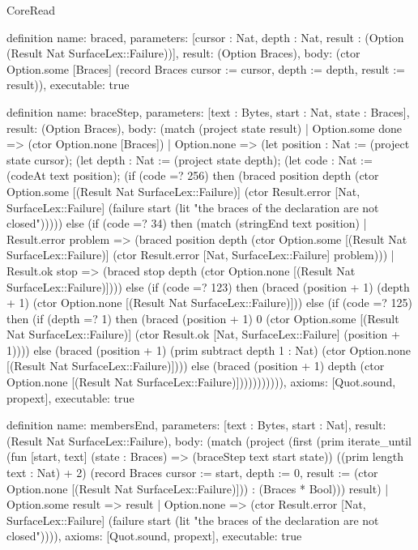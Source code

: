 \begin{lexlean}{CoreRead}
\begin{semanticmodule}
definition{
  name: braced,
  parameters: [cursor : Nat, depth : Nat, result : (Option (Result Nat SurfaceLex::Failure))],
  result: (Option Braces),
  body: (ctor Option.some [Braces] (record Braces {cursor := cursor, depth := depth, result := result})),
  executable: true
}

definition{
  name: braceStep,
  parameters: [text : Bytes, start : Nat, state : Braces],
  result: (Option Braces),
  body: (match (project state result)
    | Option.some done => (ctor Option.none [Braces])
    | Option.none => (let position : Nat := (project state cursor); (let depth : Nat := (project state depth); (let code : Nat := (codeAt text position); (if (code =? 256) then (braced position depth (ctor Option.some [(Result Nat SurfaceLex::Failure)] (ctor Result.error [Nat, SurfaceLex::Failure] (failure start (lit "the braces of the declaration are not closed"))))) else (if (code =? 34) then (match (stringEnd text position)
      | Result.error problem => (braced position depth (ctor Option.some [(Result Nat SurfaceLex::Failure)] (ctor Result.error [Nat, SurfaceLex::Failure] problem)))
      | Result.ok stop => (braced stop depth (ctor Option.none [(Result Nat SurfaceLex::Failure)]))) else (if (code =? 123) then (braced (position + 1) (depth + 1) (ctor Option.none [(Result Nat SurfaceLex::Failure)])) else (if (code =? 125) then (if (depth =? 1) then (braced (position + 1) 0 (ctor Option.some [(Result Nat SurfaceLex::Failure)] (ctor Result.ok [Nat, SurfaceLex::Failure] (position + 1)))) else (braced (position + 1) (prim subtract depth 1 : Nat) (ctor Option.none [(Result Nat SurfaceLex::Failure)]))) else (braced (position + 1) depth (ctor Option.none [(Result Nat SurfaceLex::Failure)])))))))))),
  axioms: [Quot.sound, propext],
  executable: true
}

definition{
  name: membersEnd,
  parameters: [text : Bytes, start : Nat],
  result: (Result Nat SurfaceLex::Failure),
  body: (match (project (first (prim iterate_until (fun [start, text] (state : Braces) => (braceStep text start state)) ((prim length text : Nat) + 2) (record Braces {cursor := start, depth := 0, result := (ctor Option.none [(Result Nat SurfaceLex::Failure)])}) : (Braces * Bool))) result)
    | Option.some result => result
    | Option.none => (ctor Result.error [Nat, SurfaceLex::Failure] (failure start (lit "the braces of the declaration are not closed")))),
  axioms: [Quot.sound, propext],
  executable: true
}


\end{semanticmodule}
\end{lexlean}
